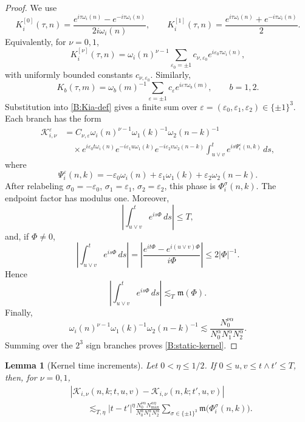 \documentclass[10pt]{amsart}
\numberwithin{equation}{section}
\theoremstyle{plain}
\newtheorem{lemma}[theorem]{Lemma}
\theoremstyle{definition}
\theoremstyle{remark}
\newcommand{\calK}{\mathcal{K}}
\newcommand{\frakm}{\mathfrak{m}}
\begin{document}
\begin{proof}
We use
\[
        K_i^{[0]}(\tau,n)=
        \frac{e^{i\tau\omega_i(n)}-e^{-i\tau\omega_i(n)}}{2i\omega_i(n)},
        \qquad
        K_i^{[1]}(\tau,n)=
        \frac{e^{i\tau\omega_i(n)}+e^{-i\tau\omega_i(n)}}{2}.
\]
Equivalently, for \(\nu=0,1\),
\[
        K_i^{[\nu]}(\tau,n)
        =
        \omega_i(n)^{\nu-1}
        \sum_{\varepsilon_0=\pm1}c_{\nu,\varepsilon_0}e^{i\varepsilon_0\tau\omega_i(n)},
\]
with uniformly bounded constants \(c_{\nu,\varepsilon_0}\).  Similarly,
\[
        K_b(\tau,m)=
        \omega_b(m)^{-1}
        \sum_{\varepsilon=\pm1}c_\varepsilon e^{i\varepsilon\tau\omega_b(m)},
        \qquad b=1,2.
\]
Substitution into \eqref{B:Kia-def} gives a finite sum over \(\varepsilon=(\varepsilon_0,\varepsilon_1,\varepsilon_2)\in\{\pm1\}^3\).  Each branch has the form
\[
\begin{aligned}
        \calK_{i,\nu}^{\varepsilon}
        &=
        C_{\nu,\varepsilon}
        \omega_i(n)^{\nu-1}\omega_1(k)^{-1}\omega_2(n-k)^{-1} \\
        &\quad\times
        e^{i\varepsilon_0t\omega_i(n)}
        e^{-i\varepsilon_1u\omega_1(k)}
        e^{-i\varepsilon_2v\omega_2(n-k)}
        \int_{u\vee v}^t e^{is\Psi_i^\varepsilon(n,k)}\,ds,
\end{aligned}
\]
where
\[
        \Psi_i^\varepsilon(n,k)
        =
        -\varepsilon_0\omega_i(n)+\varepsilon_1\omega_1(k)+\varepsilon_2\omega_2(n-k).
\]
After relabeling \(\sigma_0=-\varepsilon_0\), \(\sigma_1=\varepsilon_1\), \(\sigma_2=\varepsilon_2\), this phase is \(\Phi_i^\sigma(n,k)\).  The endpoint factor has modulus one.  Moreover,
\[
        \left|\int_{u\vee v}^t e^{is\Phi}\,ds\right|\le T,
\]
and, if \(\Phi\ne0\),
\[
        \left|\int_{u\vee v}^t e^{is\Phi}\,ds\right|
        =
        \left|\frac{e^{it\Phi}-e^{i(u\vee v)\Phi}}{i\Phi}\right|
        \le 2|\Phi|^{-1}.
\]
Hence
\[
        \left|\int_{u\vee v}^t e^{is\Phi}\,ds\right|
        \lesssim_T\frakm(\Phi).
\]
Finally,
\[
        \omega_i(n)^{\nu-1}\omega_1(k)^{-1}\omega_2(n-k)^{-1}
        \lesssim
        \frac{N_0^{\nu\alpha}}{N_0^\alpha N_1^\alpha N_2^\alpha}.
\]
Summing over the \(2^3\) sign branches proves \eqref{B:static-kernel}.
\end{proof}

\begin{lemma}[Kernel time increments]\label{lem:B-kernel-incr}
Let \(0<\eta\le1/2\).  If \(0\le u,v\le t\wedge t'\le T\), then, for \(\nu=0,1\),
\begin{equation}\label{B:kernel-incr}
\begin{aligned}
&|\calK_{i,\nu}(n,k;t,u,v)-\calK_{i,\nu}(n,k;t',u,v)| \\
&\qquad\lesssim_{T,\eta}
 |t-t'|^\eta
 \frac{N_0^{\nu\alpha}N_{\max}^{\alpha\eta}}
      {N_0^\alpha N_1^\alpha N_2^\alpha}
 \sum_{\sigma\in\{\pm1\}^3}\frakm\bigl(\Phi_i^\sigma(n,k)\bigr).
\end{aligned}
\end{equation}
\end{lemma}
\end{document}
